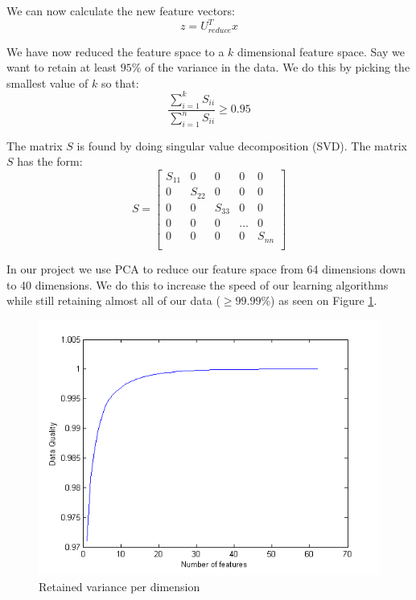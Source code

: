 We can now calculate the new feature vectors:
\begin{equation}
z = U_{reduce}^Tx
\end{equation}

We have now reduced the feature space to a $k$ dimensional feature space.
Say we want to retain at least $95\%$ of the variance in the data.
We do this by picking the smallest value of $k$ so that:
\begin{equation}
\frac{\displaystyle\sum^{k}_{i=1} S_{ii}}{\displaystyle\sum^{n}_{i=1} S_{ii}} \geq 0.95
\end{equation}

The matrix $S$ is found by doing singular value decomposition (SVD). The matrix $S$ has the form:
\begin{equation}
S =  
\begin{bmatrix}
S_{11} & 0 & 0 & 0 & 0 \\
0 & S_{22} & 0 & 0 & 0 \\
0 & 0 & S_{33} & 0 & 0 \\
0 & 0 & 0 & \dots & 0 \\
0 & 0 & 0 & 0 & S_{nn} \\
\end{bmatrix}
\end{equation}

In our project we use PCA to reduce our feature space from 64 dimensions down to 40 dimensions.
We do this to increase the speed of our learning algorithms while still retaining almost all of our data ($\geq 99.99\%$) as seen on Figure \ref{fig:pca-on-our-data}.

\begin{figure}[H]
\centering
\includegraphics[scale = 0.8]{billeder/pca-on-our-data}
\caption{ Retained variance per dimension}
\label{fig:pca-on-our-data}
\end{figure}

